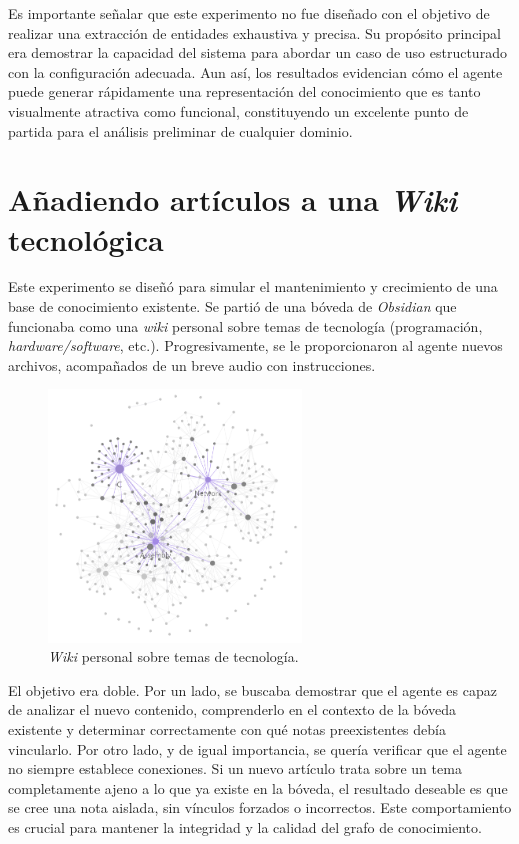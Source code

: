 Es importante señalar que este experimento no fue diseñado con el objetivo de realizar una extracción de entidades exhaustiva y precisa. Su propósito principal era demostrar la capacidad del sistema para abordar un caso de uso estructurado con la configuración adecuada. Aun así, los resultados evidencian cómo el agente puede generar rápidamente una representación del conocimiento que es tanto visualmente atractiva como funcional, constituyendo un excelente punto de partida para el análisis preliminar de cualquier dominio.

\section{Añadiendo artículos a una \textit{Wiki} tecnológica}
Este experimento se diseñó para simular el mantenimiento y crecimiento de una base de conocimiento existente. Se partió de una bóveda de \textit{Obsidian} que funcionaba como una \textit{wiki} personal sobre temas de tecnología (programación, \textit{hardware/software}, etc.). Progresivamente, se le proporcionaron al agente nuevos archivos, acompañados de un breve audio con instrucciones.

\begin{figure}[h!]
    \centering
    \includegraphics[width=0.6\textwidth]{figures/WikiSamples2.png}
    \caption{\textit{Wiki} personal sobre temas de tecnología.}
    \label{fig:wiki_tech_graph}
\end{figure}

El objetivo era doble. Por un lado, se buscaba demostrar que el agente es capaz de analizar el nuevo contenido, comprenderlo en el contexto de la bóveda existente y determinar correctamente con qué notas preexistentes debía vincularlo. Por otro lado, y de igual importancia, se quería verificar que el agente no siempre establece conexiones. Si un nuevo artículo trata sobre un tema completamente ajeno a lo que ya existe en la bóveda, el resultado deseable es que se cree una nota aislada, sin vínculos forzados o incorrectos. Este comportamiento es crucial para mantener la integridad y la calidad del grafo de conocimiento.

